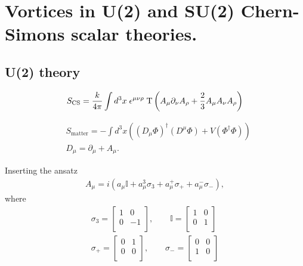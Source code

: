 
    \graphicspath{{Background_Folder/figures/PNG/}{Background_Folder/figures/PDF/}{Background_Folder/figures/}}

\chapter{Vortices in U(2) and SU(2) Chern-Simons scalar theories.}


\section{U(2) theory}


\begin{align}
S_{\text{CS}} = \frac{k}{4 \pi} \int d^3x \; \epsilon^{\mu \nu \rho} \; \mathrm{T}\left(A_{\mu} \partial_{\nu}A_{\rho}+ \frac{2}{3} A_{\mu} A_{\nu}A_{\rho} \right)
\end{align}


\begin{align}
&S_{\text{matter}}= - \int d^3x \left( \left(D_{\mu} \Phi \right)^{\dag} \left(D^{\mu} \Phi \right) + V\left(\Phi^{\dag}\Phi \right)\right) \\
&D_{\mu} = \partial_{\mu} + A_{\mu}.
\end{align}
    
Inserting the ansatz
\begin{align}
    A_{\mu} = i \left(a_{\mu} \mathbb{I} +a_{\mu}^3 \sigma_3 + a_{\mu}^+ \sigma_{+} +a_{\mu}^{-} \sigma_{-} \right),
\end{align}
    where
    \begin{align}
        \sigma_3 = \begin{bmatrix}
            1 & 0 \\
            0 & -1 \\
        \end{bmatrix}, \qquad \mathbb{I}= \begin{bmatrix}
            1 & 0\\
            0 & 1\\
        \end{bmatrix} \\
        \sigma_+ =\begin{bmatrix}
            0 & 1\\
            0 & 0\\
        \end{bmatrix}, \qquad \sigma_- = \begin{bmatrix}
            0 &0\\
            1 &0\\
        \end{bmatrix}
    \end{align}

